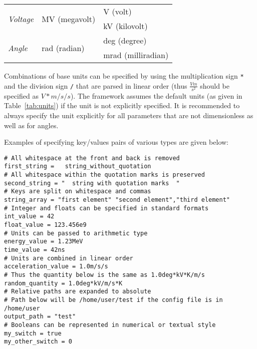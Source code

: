 \begin{table}[tbp]
\begin{tabular}{lll}
\midrule
\multirow{2}{*}{\textit{Voltage}} & \multirow{2}{*}{MV (megavolt)}          & V (volt)                 \\
                                  &                                         & kV (kilovolt)            \\
\midrule
\multirow{2}{*}{\textit{Angle}}   & \multirow{2}{*}{rad (radian)}           & deg (degree)             \\
                                  &                                         & mrad (milliradian)       \\
\bottomrule
\end{tabular}
\end{table}

Combinations of base units can be specified by using the multiplication sign \texttt{*} and the division sign \texttt{/} that are parsed in linear order (thus $\frac{V m}{s^2}$ should be specified as $V*m/s/s$).
The framework assumes the default units (as given in Table~\ref{tab:units}) if the unit is not explicitly specified.
It is recommended to always specify the unit explicitly for all parameters that are not dimensionless as well as for angles.

Examples of specifying key/values pairs of various types are given below:
\begin{verbatim}
# All whitespace at the front and back is removed
first_string =   string_without_quotation
# All whitespace within the quotation marks is preserved
second_string = "  string with quotation marks  "
# Keys are split on whitespace and commas
string_array = "first element" "second element","third element"
# Integer and floats can be specified in standard formats
int_value = 42
float_value = 123.456e9
# Units can be passed to arithmetic type
energy_value = 1.23MeV
time_value = 42ns
# Units are combined in linear order
acceleration_value = 1.0m/s/s
# Thus the quantity below is the same as 1.0deg*kV*K/m/s
random_quantity = 1.0deg*kV/m/s*K
# Relative paths are expanded to absolute
# Path below will be /home/user/test if the config file is in /home/user
output_path = "test"
# Booleans can be represented in numerical or textual style
my_switch = true
my_other_switch = 0
\end{verbatim}

